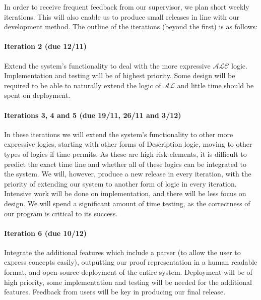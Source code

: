 In order to receive frequent feedback from our supervisor, we plan short weekly iterations. This will also enable us to produce small releases in line with our development method. The outline of the iterations (beyond the first) is as follows:

\paragraph{Iteration 2 (due 12/11)} Extend the system's functionality to deal with the more expressive $\mathcal{ALC}$ logic. Implementation and testing will be of highest priority. Some design will be required to be able to naturally extend the logic of $\mathcal{AL}$ and little time should be spent on deployment.

\paragraph{Iterations 3, 4 and 5 (due 19/11, 26/11 and 3/12)} In these iterations we will extend the system's functionality to other more expressive logics, starting with other forms of Description logic, moving to other types of logics if time permits. As these are high risk elements, it is difficult to predict the exact time line and whether all of these logics can be integrated to the system. We will, however, produce a new release in every iteration, with the priority of extending our system to another form of logic in every iteration. 
Intensive work will be done on implementation, and there will be less focus on design. We will spend a significant amount of time testing, as the correctness of our program is critical to its success.

\paragraph{Iteration 6 (due 10/12)} Integrate the additional features which include a parser (to allow the user to express concepts easily), outputting our proof representation in a human readable format, and open-source deployment of the entire system. Deployment will be of high priority, some implementation and testing will be needed for the additional features.
Feedback from users will be key in producing our final release.
